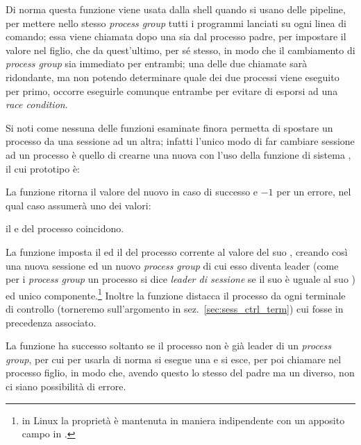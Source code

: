 Di norma questa funzione viene usata dalla shell quando si usano delle
pipeline, per mettere nello stesso \textit{process group} tutti i programmi
lanciati su ogni linea di comando; essa viene chiamata dopo una 
sia dal processo padre, per impostare il valore nel figlio, che da
quest'ultimo, per sé stesso, in modo che il cambiamento di \textit{process
  group} sia immediato per entrambi; una delle due chiamate sarà ridondante,
ma non potendo determinare quale dei due processi viene eseguito per primo,
occorre eseguirle comunque entrambe per evitare di esporsi ad una \textit{race
  condition}.

Si noti come nessuna delle funzioni esaminate finora permetta di spostare un
processo da una sessione ad un altra; infatti l'unico modo di far cambiare
sessione ad un processo è quello di crearne una nuova con l'uso della funzione
di sistema , il cui prototipo è:

\begin{funcproto}{
}

{La funzione ritorna il valore del nuovo  in caso di successo e $-1$
  per un errore, nel qual caso  assumerà uno dei valori:
  \begin{errlist}
  \item[\errcode{EPERM}] il  e  del processo coincidono.
  \end{errlist}
}
\end{funcproto}


La funzione imposta il  ed il  del processo corrente al
valore del suo , creando così una nuova sessione ed un nuovo
\textit{process group} di cui esso diventa leader (come per i \textit{process
  group} un processo si dice \textsl{leader di sessione} se il suo  è
uguale al suo ) ed unico componente.\footnote{in Linux la proprietà è
  mantenuta in maniera indipendente con un apposito campo  in
  .} Inoltre la funzione distacca il processo da ogni
terminale di controllo (torneremo sull'argomento in
sez.~\ref{sec:sess_ctrl_term}) cui fosse in precedenza associato.

La funzione ha successo soltanto se il processo non è già leader di un
\textit{process group}, per cui per usarla di norma si esegue una 
e si esce, per poi chiamare  nel processo figlio, in modo che,
avendo questo lo stesso  del padre ma un  diverso, non ci
siano possibilità di errore.

